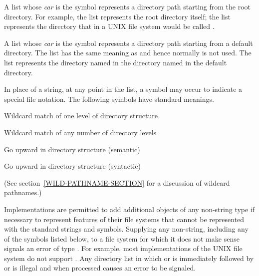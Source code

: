   A list whose \emph{car} is the symbol  represents a directory path
  starting from the root directory.  For example, the list  represents
  the root directory itself;  the list  represents
  the directory that in a UNIX file system would be called .

  A list whose \emph{car} is the symbol  represents a directory path
  starting from a default directory.  The list  has the same
  meaning as  and hence normally is not used.  The list 
  represents the directory named  in the directory named  in the
  default directory.

  In place of a string, at any point in the list, a symbol may occur to
  indicate a special file notation. The following symbols have standard
  meanings.
\begin{indentdesc}{7pc}
\item[\cd{:wild}]            Wildcard match of one level of directory structure
\item[\cd{:wild-inferiors}]  Wildcard match of any number of directory levels
\item[\cd{:up}]              Go upward in directory structure (semantic)
\item[\cd{:back}]            Go upward in directory structure (syntactic)
\end{indentdesc}
  (See section~\ref{WILD-PATHNAME-SECTION} for a discussion of wildcard pathnames.)

  Implementations are permitted to add additional objects of any
  non-string type if necessary to represent features of their file systems
  that cannot be represented with the standard strings and symbols.
  Supplying any non-string, including any of the symbols listed below, to a
  file system for which it does not make sense signals an error of type
  .  For example, most implementations of the UNIX file system
  do not support .  Any directory list in which
   or  is immediately followed by  or 
  is illegal and when  processed causes an error to be signaled.

